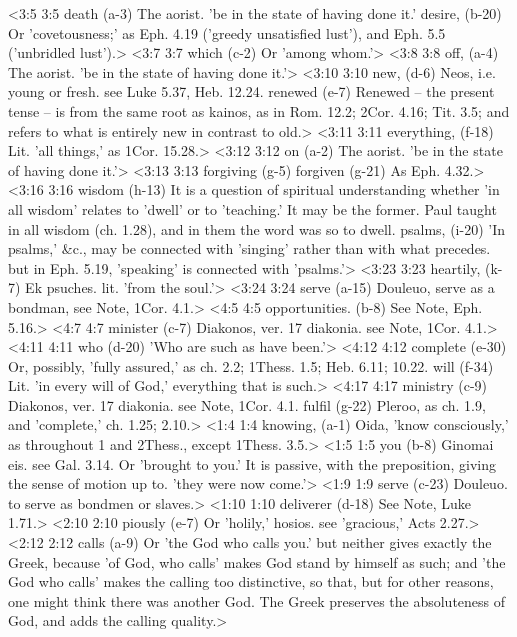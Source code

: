<3:5 3:5  death (a-3) The aorist. 'be in the state of having done it.'
  desire, (b-20)  Or 'covetousness;' as Eph. 4.19 ('greedy unsatisfied lust'),  and Eph. 5.5 ('unbridled lust').>
<3:7 3:7  which (c-2)  Or 'among whom.'>
<3:8 3:8  off, (a-4) The aorist. 'be in the state of having done it.'>
<3:10 3:10  new, (d-6)  Neos, i.e. young or fresh. see Luke 5.37, Heb. 12.24.
  renewed (e-7)  Renewed -- the present tense -- is from the same root as  kainos, as in Rom. 12.2; 2Cor. 4.16; Tit. 3.5; and refers to  what is entirely new in contrast to old.>
<3:11 3:11  everything, (f-18)  Lit. 'all things,' as 1Cor. 15.28.>
<3:12 3:12  on (a-2)  The aorist. 'be in the state of having done it.'>
<3:13 3:13  forgiving (g-5)  forgiven (g-21)
  As Eph. 4.32.>
<3:16 3:16  wisdom (h-13)  It is a question of spiritual understanding whether 'in all  wisdom' relates to 'dwell' or to 'teaching.' It may be the  former. Paul taught in all wisdom (ch. 1.28), and in them the  word was so to dwell.
  psalms, (i-20)  'In psalms,' &c., may be connected with 'singing' rather than  with what precedes. but in Eph. 5.19, 'speaking' is connected  with 'psalms.'>
<3:23 3:23  heartily, (k-7)  Ek psuches. lit. 'from the soul.'>
<3:24 3:24  serve (a-15)  Douleuo, serve as a bondman, see Note, 1Cor. 4.1.>
<4:5 4:5  opportunities. (b-8)  See Note, Eph. 5.16.>
<4:7 4:7  minister (c-7)  Diakonos, ver. 17 diakonia. see Note, 1Cor. 4.1.>
<4:11 4:11  who (d-20)  'Who are such as have been.'>
<4:12 4:12  complete (e-30)  Or, possibly, 'fully assured,' as ch. 2.2; 1Thess. 1.5; Heb.  6.11; 10.22.
  will (f-34)  Lit. 'in every will of God,' everything that is such.>
<4:17 4:17  ministry (c-9)  Diakonos, ver. 17 diakonia. see Note, 1Cor. 4.1.
  fulfil (g-22)  Pleroo, as ch. 1.9, and 'complete,' ch. 1.25; 2.10.>
<1:4 1:4  knowing, (a-1)  Oida, 'know consciously,' as throughout 1 and 2Thess.,  except 1Thess. 3.5.>
<1:5 1:5  you (b-8)  Ginomai eis. see Gal. 3.14. Or 'brought to you.' It is  passive, with the preposition, giving the sense of motion up  to. 'they were now come.'>
<1:9 1:9  serve (c-23)  Douleuo. to serve as bondmen or slaves.>
<1:10 1:10  deliverer (d-18)  See Note, Luke 1.71.>
<2:10 2:10  piously (e-7)  Or 'holily,' hosios. see 'gracious,' Acts 2.27.>
<2:12 2:12  calls (a-9)  Or 'the God who calls you.' but neither gives exactly the  Greek, because 'of God, who calls' makes God stand by himself  as such; and 'the God who calls' makes the calling too  distinctive, so that, but for other reasons, one might think  there was another God. The Greek preserves the absoluteness of  God, and adds the calling quality.>
